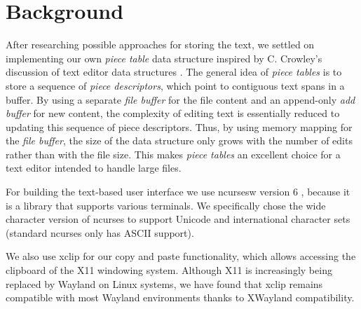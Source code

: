 \section{Background}\label{sec:bg}

After researching possible approaches for storing the text, we settled on implementing our own \textit{piece table} data structure inspired by C. Crowley's discussion of text editor data structures \cite{crowley1998data}. The general idea of \textit{piece tables} is to store a sequence of \textit{piece descriptors}, which point to contiguous text spans in a buffer. By using a separate \textit{file buffer} for the file content and an append-only \textit{add buffer} for new content, the complexity of editing text is essentially reduced to updating this sequence of piece descriptors. Thus, by using memory mapping for the \textit{file buffer}, the size of the data structure only grows with the number of edits rather than with the file size. This makes \textit{piece tables} an excellent choice for a text editor intended to handle large files.
\par
\smallskip
For building the text-based user interface we use ncursesw version 6 \cite{ncursesw}, because it is a library that supports various terminals. We specifically chose the wide character version of ncurses to support Unicode and international character sets (standard ncurses only has ASCII support).
\par
\smallskip
We also use xclip \cite{xclip} for our copy and paste functionality, which allows accessing the clipboard of the X11 windowing system. Although X11 is increasingly being replaced by Wayland on Linux systems, we have found that xclip remains compatible with most Wayland environments thanks to XWayland compatibility.